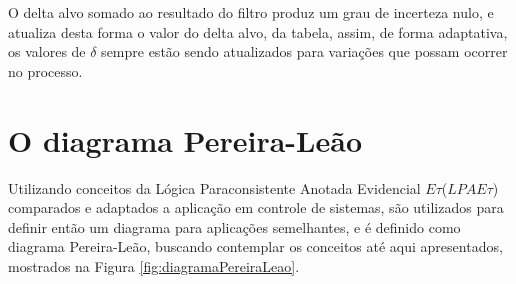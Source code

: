 O delta alvo somado ao resultado do filtro produz um grau de incerteza nulo,
e atualiza desta forma o valor do delta alvo, da tabela,
assim, de forma adaptativa, 
os valores de $\delta$ sempre estão sendo atualizados
para variações que possam ocorrer no processo. 









\newpage


\section{O diagrama Pereira-Leão}

Utilizando conceitos da Lógica Paraconsistente Anotada Evidencial $E\tau$($LPAE\tau$)
comparados e adaptados a aplicação em controle de sistemas,
são utilizados para definir então um diagrama para aplicações semelhantes,
e é definido como diagrama Pereira-Leão,
buscando contemplar os conceitos até aqui apresentados,
mostrados na Figura \ref{fig:diagramaPereiraLeao}.

